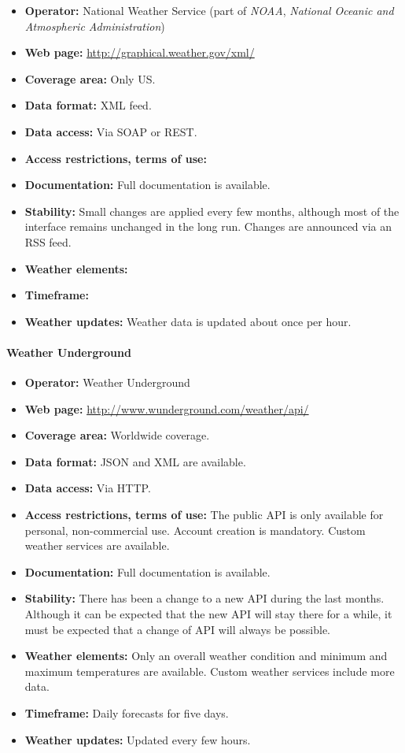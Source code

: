 \begin{itemize}
  \item \textbf{Operator:} National Weather Service (part of \emph{NOAA}, \emph{National Oceanic and Atmospheric Administration})
  \item \textbf{Web page:} \href{http://graphical.weather.gov/xml/}{http://graphical.weather.gov/xml/}
  \item \textbf{Coverage area:} Only US.
  \item \textbf{Data format:} XML feed.
  \item \textbf{Data access:} Via SOAP or REST.
  \item \textbf{Access restrictions, terms of use:} %
  \item \textbf{Documentation:} Full documentation is available.
  \item \textbf{Stability:} Small changes are applied every few months, although most of the interface remains unchanged in the long run. Changes are announced via an RSS feed.
  \item \textbf{Weather elements:} %
  \item \textbf{Timeframe:} %
  \item \textbf{Weather updates:} Weather data is updated about once per hour. 
\end{itemize}

\paragraph{Weather Underground}

\begin{itemize}
  \item \textbf{Operator:} Weather Underground
  \item \textbf{Web page:} \href{http://www.wunderground.com/weather/api/}{http://www.wunderground.com/weather/api/}
  \item \textbf{Coverage area:} Worldwide coverage.
  \item \textbf{Data format:} JSON and XML are available.
  \item \textbf{Data access:} Via HTTP.
  \item \textbf{Access restrictions, terms of use:} The public API is only available for personal, non-commercial use. Account creation is mandatory. Custom weather services are available.
  \item \textbf{Documentation:} Full documentation is available.
  \item \textbf{Stability:} There has been a change to a new API during the last months. Although it can be expected that the new API will stay there for a while, it must be expected that a change of API will always be possible.
  \item \textbf{Weather elements:} Only an overall weather condition and minimum and maximum temperatures are available. Custom weather services include more data.
  \item \textbf{Timeframe:} Daily forecasts for five days.
  \item \textbf{Weather updates:} Updated every few hours.
\end{itemize}

